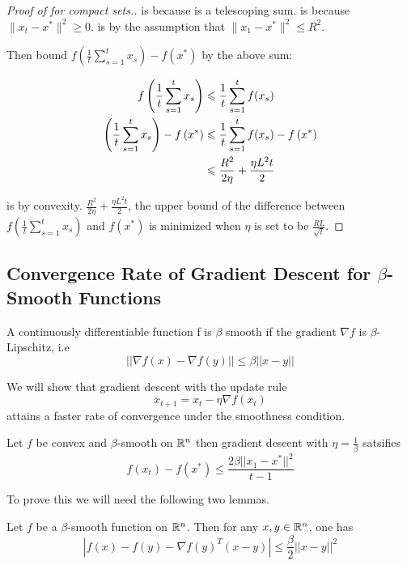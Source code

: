 \begin{proof}[Proof of  for compact sets.]
 is because  is a telescoping sum.
 is because $\lVert x_{t} - x^* \rVert^2 \geq 0$.
 is by the assumption that $\lVert x_1 - x^* \rVert^2 \leq R^2$.

Then bound $f\left(\frac{1}{t}\sum_{s=1}^t x_s\right) - f\left(x^*\right)$ by
the above sum:

\begin{align}
    f\left(\frac{1}{t}\sum_{s=1}^t x_s\right) &\leq \frac{1}{t} \sum_{s=1}^t f(x_s) \equationlabel{k} \\
    \left(\frac{1}{t}\sum_{s=1}^t x_s\right) - f\left(x^*\right) &\leq \frac{1}{t} \sum_{s=1}^t f(x_s) - f\left(x^*\right) \equationlabel{l} \\
    &\leq \frac{R^2}{2\eta} + \frac{\eta L^2 t}{2}
\end{align}

 is by convexity. $\frac{R^2}{2\eta} + \frac{\eta L^2 t}{2}$,
the upper bound of the difference between $f\left(\frac{1}{t}\sum_{s=1}^t
x_s\right)$ and $f\left(x^*\right)$ is minimized when $\eta$ is set to be
$\frac{RL}{\sqrt{t}}$.

\end{proof}

\subsection{Convergence Rate of Gradient Descent for $\beta$-Smooth Functions}

\begin{definition}
A continuously differentiable function f is $\beta$ smooth if the gradient $\nabla f$ is $\beta$-Lipschitz, i.e
$$||\nabla f(x) - \nabla f(y)|| \leq \beta||x-y||$$
\end{definition}

We will show that gradient descent with the update rule
$$x_{t+1} = x_t - \eta \nabla f(x_t)$$
attains a faster rate of convergence under the smoothness condition.

\begin{theorem}
Let $f$ be convex and $\beta$-smooth on $\mathbb{R}^n$ then gradient descent with $\eta = \frac{1}{\beta}$ satsifies
$$f(x_t) - f(x^*) \leq \frac{2\beta||x_1 - x^*||^2}{t-1}$$
\end{theorem}
To prove this we will need the following two lemmas.

\begin{lemma}\label{l1}
Let $f$ be a $\beta$-smooth function on $\mathbb{R}^n$.  Then for any $x,y \in \mathbb{R}^n$, one has
$$|f(x) - f(y) - \nabla f(y)^T(x-y)| \leq \frac{\beta}{2}||x-y||^2$$
\end{lemma}

